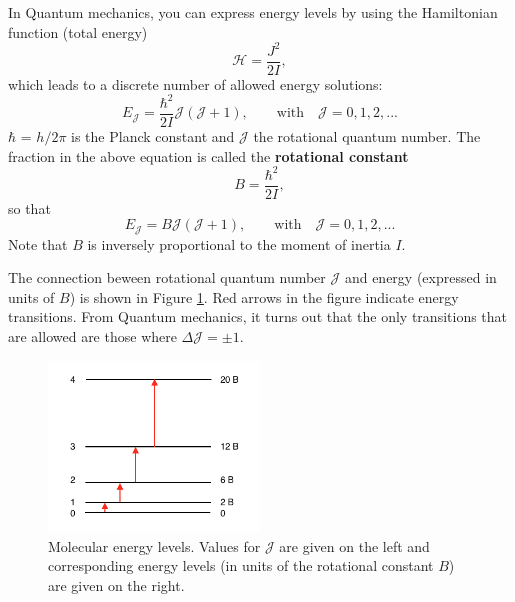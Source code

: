 In Quantum mechanics, you can express energy levels by using the Hamiltonian function (total energy)
\begin{equation}
\mathcal{H}=\frac{J^2}{2I},
\end{equation}
which leads to a discrete number of allowed energy solutions:
\begin{equation}
E_\mathcal{J} = \frac{\hbar^2}{2I} \mathcal{J}(\mathcal{J}+1), \qquad \text{with} \quad \mathcal{J} = 0, 1, 2, ...
\end{equation}
$\hbar$ = $h/2\pi$ is the Planck constant and $\mathcal{J}$ the
rotational quantum number. The fraction in the above equation is
called the \textbf{rotational constant} 
\begin{equation}
  B = \frac{\hbar^2}{2I}  ,
\end{equation}
so that
\begin{equation}
E_\mathcal{J} = B \mathcal{J}(\mathcal{J}+1), \qquad \text{with} \quad \mathcal{J} = 0, 1, 2, ...
\end{equation}
Note that $B$ is inversely proportional to the moment of inertia $I$.

The connection beween rotational quantum number $\mathcal{J}$ and
energy (expressed in units of $B$) is shown in Figure
\ref{fig:energy_levels}. Red arrows in the figure indicate energy
transitions.  From Quantum mechanics, it turns out that the only
transitions that are allowed are those where
$\Delta \mathcal{J} = \pm1$. 

\begin{figure}
\begin{center}
\includegraphics[width=0.5\textwidth]{figures/Energy_levels}
\caption{Molecular energy levels. Values for $\mathcal{J}$ are given on the left and corresponding energy
  levels (in units of the rotational constant $B$) are given on the right.}
\label{fig:energy_levels}
\end{center}
\end{figure}

